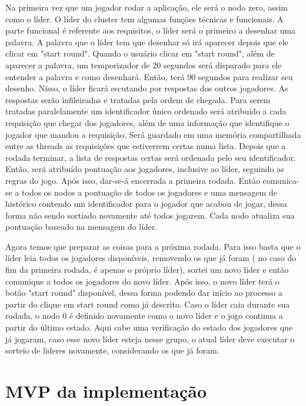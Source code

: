 \documentclass{article}
\begin{document}
Na primeira vez que um jogador rodar a aplicação, ele será o nodo zero, assim como o líder. O líder do cluster tem algumas funções técnicas e funcionais. A parte funcional é referente aos requisitos, o líder será o primeiro a desenhar uma palavra. A palavra que o líder tem que desenhar só irá aparecer depois que ele clicar em "start round". Quando o usuário clicar em "start round", além de aparecer a palavra, um temporizador de 20 segundos será disparado para ele entender a palavra e como desenhará. Então, terá 90 segundos para realizar seu desenho. Nisso, o líder ficará escutando por respostas dos outros jogadores. As respostas serão infileiradas e tratadas pela ordem de chegada. Para serem tratadas paralelamente um identificador único ordenado será atribuído a cada requisição que chegar dos jogadores, além de uma informação que identifique o jogador que mandou a requisição. Será guardado em uma memória compartilhada entre as threads as requisições que estiverrem certas numa lista. Depois que a rodada terminar, a lista de respostas certas será ordenada pelo seu identificador. Então, será atribuído pontuação aos jogadores, inclusive ao líder, seguindo as regras do jogo. Após isso, dar-se-á encerrada a primeira rodada. Então comunica-se a todos os nodos a pontuação de todos os jogadores e uma mensagem de histórico contendo um identificador para o jogador que acabou de jogar, dessa forma não sendo sortiado novamente até todos jogarem. Cada nodo atualiza sua pontuação baseado na mensagem do líder. 


Agora temos que preparar as coisas para a próxima rodada. Para isso basta que o líder leia todos os jogadores disponíveis, removendo os que já foram ( no caso do fim da primeira rodada, é apenas o próprio líder), sortei um novo líder e então comunique a todos os jogadores do novo líder. Após isso, o novo líder terá o botão "start round" disponível, dessa forma podendo dar início ao processo a partir do clique em start round como já descrito. Caso o líder caia durante sua rodada, o nodo 0 é definido novamente como o novo líder e o jogo continua a partir do último estado. Aqui cabe uma verificação do estado dos jogadores que já jogaram, caso esse novo líder esteja nesse grupo, o atual líder deve executar o sorteio de lideres novamente, considerando os que já foram. 


\section{MVP da implementação}
\end{document}

